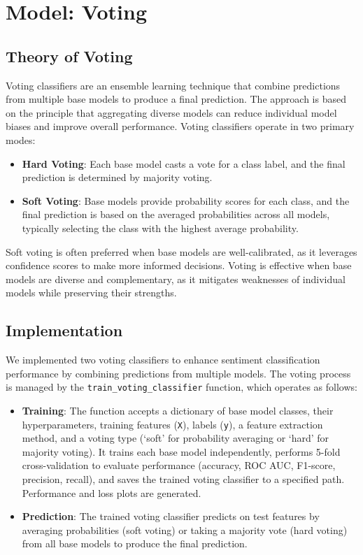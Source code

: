 \section{Model: Voting}

\subsection{Theory of Voting}
Voting classifiers are an ensemble learning technique that combine predictions from multiple base models to produce a final prediction. The approach is based on the principle that aggregating diverse models can reduce individual model biases and improve overall performance. Voting classifiers operate in two primary modes:
\begin{itemize}
    \item \textbf{Hard Voting}: Each base model casts a vote for a class label, and the final prediction is determined by majority voting.
    \item \textbf{Soft Voting}: Base models provide probability scores for each class, and the final prediction is based on the averaged probabilities across all models, typically selecting the class with the highest average probability.
\end{itemize}
Soft voting is often preferred when base models are well-calibrated, as it leverages confidence scores to make more informed decisions. Voting is effective when base models are diverse and complementary, as it mitigates weaknesses of individual models while preserving their strengths.

\subsection{Implementation}
We implemented two voting classifiers to enhance sentiment classification performance by combining predictions from multiple models. The voting process is managed by the \texttt{train\_voting\_classifier} function, which operates as follows:

\begin{itemize}
    \item \textbf{Training}: The function accepts a dictionary of base model classes, their hyperparameters, training features (\texttt{X}), labels (\texttt{y}), a feature extraction method, and a voting type (`soft' for probability averaging or `hard' for majority voting). It trains each base model independently, performs 5-fold cross-validation to evaluate performance (accuracy, ROC AUC, F1-score, precision, recall), and saves the trained voting classifier to a specified path. Performance and loss plots are generated.
    \item \textbf{Prediction}: The trained voting classifier predicts on test features by averaging probabilities (soft voting) or taking a majority vote (hard voting) from all base models to produce the final prediction.
\end{itemize}


